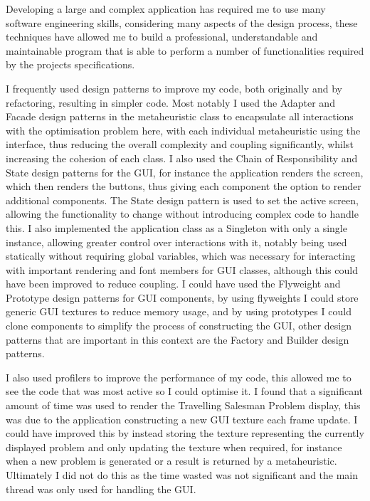 \documentclass[]{final_report}
\begin{document}
Developing a large and complex application has required me to use many software engineering skills, considering many aspects of the design process, these techniques have allowed me to build a professional, understandable and maintainable program that is able to perform a number of functionalities required by the projects specifications.

I frequently used design patterns to improve my code, both originally and by refactoring, resulting in simpler code. Most notably I used the Adapter and Facade design patterns in the metaheuristic class to encapsulate all interactions with the optimisation problem here, with each individual metaheuristic using the interface, thus reducing the overall complexity and coupling significantly, whilst increasing the cohesion of each class. I also used the Chain of Responsibility and State design patterns for the GUI, for instance the application renders the screen, which then renders the buttons, thus giving each component the option to render additional components. The State design pattern is used to set the active screen, allowing the functionality to change without introducing complex code to handle this. I also implemented the application class as a Singleton with only a single instance, allowing greater control over interactions with it, notably being used statically without requiring global variables, which was necessary for interacting with important rendering and font members for GUI classes, although this could have been improved to reduce coupling. I could have used the Flyweight and Prototype design patterns for GUI components, by using flyweights I could store generic GUI textures to reduce memory usage, and by using prototypes I could clone components to simplify the process of constructing the GUI, other design patterns that are important in this context are the Factory and Builder design patterns.

I also used profilers to improve the performance of my code, this allowed me to see the code that was most active so I could optimise it. I found that a significant amount of time was used to render the Travelling Salesman Problem display, this was due to the application constructing a new GUI texture each frame update. I could have improved this by instead storing the texture representing the currently displayed problem and only updating the texture when required, for instance when a new problem is generated or a result is returned by a metaheuristic. Ultimately I did not do this as the time wasted was not significant and the main thread was only used for handling the GUI.
\end{document}
